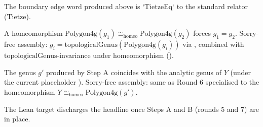 \begin{lemma}
\label{lem:polygonal-model-apply-tietze}
The boundary edge word produced above is `TietzeEq` to the standard relator (Tietze).
\leanok
\end{lemma}

\begin{lemma}
\label{lem:polygonal-model-polygon-genus-invariant}
A homeomorphism $\mathrm{Polygon4g}(g_1) \cong_{\mathrm{homeo}} \mathrm{Polygon4g}(g_2)$ forces $g_1 = g_2$.  Sorry-free assembly: $g_i = \mathrm{topologicalGenus}(\mathrm{Polygon4g}(g_i))$ via , combined with $\mathrm{topologicalGenus}$-invariance under homeomorphism ().
\leanok
\end{lemma}

\begin{lemma}
\label{lem:polygonal-model-genus-matches}
The genus $g'$ produced by Step A coincides with the analytic genus of $Y$ (under the current placeholder ).  Sorry-free assembly: same as Round 6 specialised to the homeomorphism $Y \cong_{\mathrm{homeo}} \mathrm{Polygon4g}(g')$.
\leanok
\end{lemma}

\begin{lemma}
\label{lem:polygonal-model-overview-via-steps}
The Lean target  discharges the headline once Steps A and B (rounds 5 and 7) are in place.
\leanok
\end{lemma}

